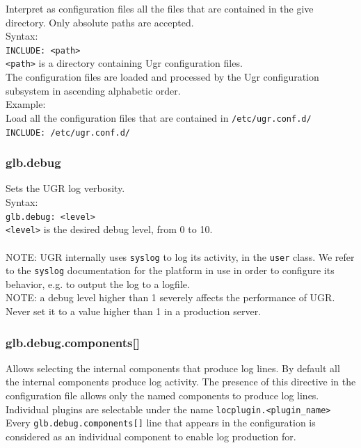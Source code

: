 \documentclass[12pt]{article} %
\begin{document}
 Interpret as configuration files all the files that are contained in the give directory. Only absolute paths are accepted.\\
 
 Syntax:\\

\lstinline"INCLUDE: <path>"\\

\lstinline"<path>" is a directory containing Ugr configuration files.\\
The configuration files are loaded and processed by the Ugr configuration subsystem in ascending alphabetic order.\\

Example:\\
Load all the configuration files that are contained in \lstinline"/etc/ugr.conf.d/"\\
\lstinline"INCLUDE: /etc/ugr.conf.d/"

\subsubsection{glb.debug}

 Sets the UGR log verbosity.\\
 
 Syntax:\\

\lstinline"glb.debug: <level>"\\

\lstinline"<level>" is the desired debug level, from 0 to 10.\\ \\
 NOTE: UGR internally uses \lstinline"syslog" to log its activity, in the \lstinline"user" class. We refer to the \lstinline"syslog" documentation for the platform in use in order to configure its behavior, e.g. to output the log to a logfile.\\
 
 NOTE: a debug level higher than 1 severely affects the performance of UGR. Never set it to a value higher than 1 in a production server.\\



\subsubsection{glb.debug.components[]}

 Allows selecting the internal components that produce log lines. By default all the internal components produce log activity. The presence of this directive in the configuration file allows only the named components to produce log lines.\\
 Individual plugins are selectable under the name \lstinline"locplugin.<plugin_name>"
 Every \lstinline"glb.debug.components[]" line that appears in the configuration is considered as an individual component to enable log production for.
\end{document}
